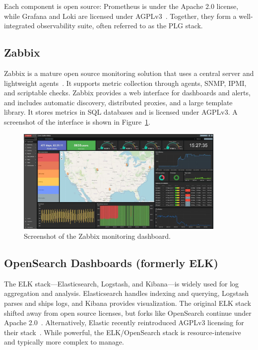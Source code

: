 Each component is open source: Prometheus is under the Apache 2.0 license, while Grafana and Loki are licensed under AGPLv3~\cite{grafana-license-change}. Together, they form a well-integrated observability suite, often referred to as the PLG stack.

\subsection*{Zabbix}
Zabbix is a mature open source monitoring solution that uses a central server and lightweight agents~\cite{zabbix-web}. It supports metric collection through agents, SNMP, IPMI, and scriptable checks. Zabbix provides a web interface for dashboards and alerts, and includes automatic discovery, distributed proxies, and a large template library. It stores metrics in SQL databases and is licensed under AGPLv3. A screenshot of the interface is shown in Figure~\ref{fig:zabbix-ui}.

\begin{figure}[h!]
  \centering
  \includegraphics[width=0.9\textwidth]{imaxes/zabbix-ui.png}
  \caption{Screenshot of the Zabbix monitoring dashboard.}
  \label{fig:zabbix-ui}
\end{figure}

\subsection*{OpenSearch Dashboards (formerly ELK)}
The ELK stack—Elasticsearch, Logstash, and Kibana—is widely used for log aggregation and analysis. Elasticsearch handles indexing and querying, Logstash parses and ships logs, and Kibana provides visualization. The original ELK stack shifted away from open source licenses, but forks like OpenSearch continue under Apache 2.0~\cite{opensearch-web}. Alternatively, Elastic recently reintroduced AGPLv3 licensing for their stack~\cite{elastic-license}. While powerful, the ELK/OpenSearch stack is resource-intensive and typically more complex to manage.

